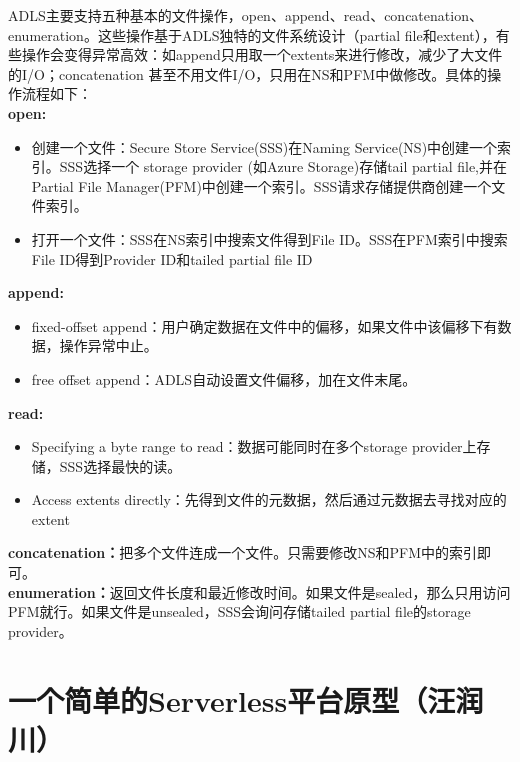 \documentclass[11pt]{article}
\begin{document}
ADLS主要支持五种基本的文件操作，open、append、read、concatenation、enumeration。这些操作基于ADLS独特的文件系统设计（partial file和extent），有些操作会变得异常高效：如append只用取一个extents来进行修改，减少了大文件的I/O；concatenation 甚至不用文件I/O，只用在NS和PFM中做修改。具体的操作流程如下：\\
\textbf{open:} 
\begin{itemize}
	\item 创建一个文件：Secure Store Service(SSS)在Naming Service(NS)中创建一个索引。SSS选择一个 storage provider (如Azure Storage)存储tail partial file,并在Partial File Manager(PFM)中创建一个索引。SSS请求存储提供商创建一个文件索引。
	\item 打开一个文件：SSS在NS索引中搜索文件得到File ID。SSS在PFM索引中搜索File ID得到Provider ID和tailed partial file ID
\end{itemize}
\textbf{append:}
\begin{itemize}
	\item fixed-offset append：用户确定数据在文件中的偏移，如果文件中该偏移下有数据，操作异常中止。
	\item free offset append：ADLS自动设置文件偏移，加在文件末尾。
\end{itemize}
\textbf{read:}
\begin{itemize}
	\item Specifying a byte range to read：数据可能同时在多个storage provider上存储，SSS选择最快的读。
	\item Access extents directly：先得到文件的元数据，然后通过元数据去寻找对应的extent
\end{itemize}
\textbf{concatenation：}把多个文件连成一个文件。只需要修改NS和PFM中的索引即可。\\
\textbf{enumeration：}返回文件长度和最近修改时间。如果文件是sealed，那么只用访问PFM就行。如果文件是unsealed，SSS会询问存储tailed partial file的storage provider。

\newpage
\section{一个简单的Serverless平台原型（汪润川）}
\end{document}
